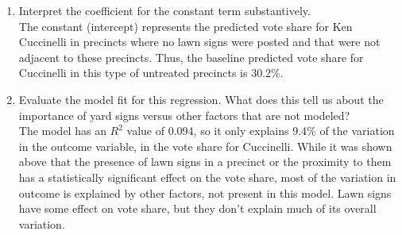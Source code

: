 \documentclass[12pt,letterpaper]{article}
\begin{document}
\begin{enumerate}
	\item [(c)] Interpret the coefficient for the constant term substantively. \\[0.5cm]
	The constant (intercept) represents the predicted vote share for Ken Cuccinelli in precincts where no lawn signs were posted and that were not adjacent to these precincts. Thus, the baseline predicted vote share for Cuccinelli in this type of untreated precincts is 30.2\%.
	\item [(d)] Evaluate the model fit for this regression.  What does this	tell us about the importance of yard signs versus other factors that are not modeled? \\[0.5cm]
	The model has an $R^2$ value of 0.094, so it only explains 9.4\% of the variation in the outcome variable, in the vote share for Cuccinelli. While it was shown above that the presence of lawn signs in a precinct or the proximity to them has a statistically significant effect on the vote share, most of the variation in outcome is explained by other factors, not present in this model. Lawn signs have some effect on vote share, but they don't explain much of its overall variation. 
	
\end{enumerate}  
\end{document}
